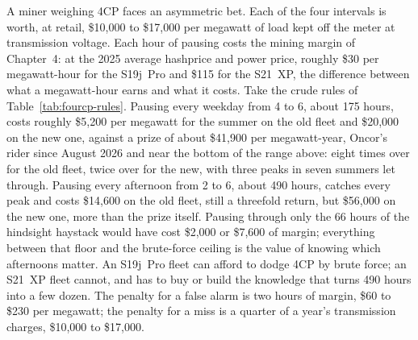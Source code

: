 A miner weighing 4CP faces an asymmetric bet. Each of the four intervals is worth, at retail, \$10,000 to \$17,000 per megawatt of load kept off the meter at transmission voltage. %
Each hour of pausing costs the mining margin of Chapter~4: at the 2025 average hashprice and power price, roughly \$30 per megawatt-hour for the S19j~Pro and \$115 for the S21~XP, the difference between what a megawatt-hour earns and what it costs. %
Take the crude rules of Table~\ref{tab:fourcp-rules}. Pausing every weekday from 4 to 6, about 175 hours, costs roughly \$5,200 per megawatt for the summer on the old fleet and \$20,000 on the new one, against a prize of about \$41,900 per megawatt-year, Oncor's rider since August 2026 and near the bottom of the range above: eight times over for the old fleet, twice over for the new, with three peaks in seven summers let through. %
Pausing every afternoon from 2 to 6, about 490 hours, catches every peak and costs \$14,600 on the old fleet, still a threefold return, but \$56,000 on the new one, more than the prize itself. %
Pausing through only the 66 hours of the hindsight haystack would have cost \$2,000 or \$7,600 of margin; everything between that floor and the brute-force ceiling is the value of knowing which afternoons matter. %
An S19j~Pro fleet can afford to dodge 4CP by brute force; an S21~XP fleet cannot, and has to buy or build the knowledge that turns 490 hours into a few dozen. The penalty for a false alarm is two hours of margin, \$60 to \$230 per megawatt; the penalty for a miss is a quarter of a year's transmission charges, \$10,000 to \$17,000. %


